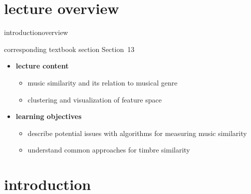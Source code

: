


\subtitle{Module 13: Music Similarity}


	

    \section[overview]{lecture overview}
        \begin{frame}{introduction}{overview}
            \begin{block}{corresponding textbook section}
                    Section~13
            \end{block}

            \begin{itemize}
                \item   \textbf{lecture content}
                    \begin{itemize}
                        \item   music similarity and its relation to musical genre
                        \item   clustering and visualization of feature space
                    \end{itemize}
                \bigskip
                \item<2->   \textbf{learning objectives}
                    \begin{itemize}
                        \item   describe potential issues with algorithms for measuring music similarity
                        \item   understand common approaches for timbre similarity
                    \end{itemize}
            \end{itemize}
        \end{frame}

    \section[intro]{introduction}


